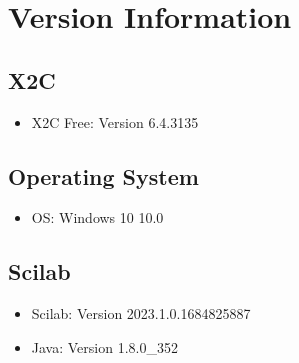 \section{Version Information}
\label{sec:version_information}

\subsection{X2C}
\begin{itemize}
  \item{X2C Free:} Version 6.4.3135
\end{itemize}

\subsection{Operating System}
\begin{itemize}
  \item{OS:} Windows 10 10.0
\end{itemize}

\subsection{Scilab}
\begin{itemize}
  \item{Scilab:} Version 2023.1.0.1684825887
  \item{Java:} Version 1.8.0\_352
\end{itemize}

